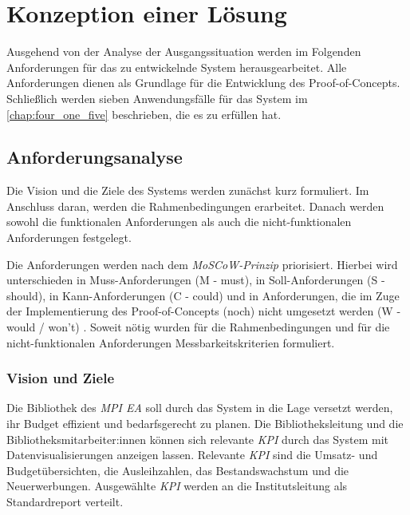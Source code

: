 \chapter{Konzeption einer Lösung}
\label{chap:four}
Ausgehend von der Analyse der Ausgangssituation werden im Folgenden 
Anforderungen für das zu entwickelnde System herausgearbeitet.
Alle Anforderungen dienen als Grundlage für die Entwicklung des Proof-of-Concepts. 
Schließlich werden sieben Anwendungsfälle für das System im \autoref{chap:four_one_five} beschrieben, die es zu erfüllen hat.


\section{Anforderungsanalyse}
Die Vision und die Ziele des Systems werden zunächst kurz formuliert. Im Anschluss daran, werden die Rahmenbedingungen erarbeitet. Danach werden sowohl die funktionalen Anforderungen als
auch die nicht-funktionalen Anforderungen festgelegt. 


Die Anforderungen werden nach dem \textit{MoSCoW-Prinzip} priorisiert. 
Hierbei wird unterschieden in Muss-Anforderungen (M - must), in Soll-Anforderungen (S - should), in Kann-Anforderungen (C - could) und in Anforderungen,
die im Zuge der Implementierung des Proof-of-Concepts (noch) nicht umgesetzt werden (W - would / won't) \cite[vgl.][57]{stephens_beginning_2015}.
Soweit nötig wurden für die Rahmenbedingungen und für die nicht-funktionalen Anforderungen Messbarkeitskriterien formuliert. 

\subsection{Vision und Ziele}
Die Bibliothek des \textit{\acrshort{MPI EA}} soll durch das System in die Lage versetzt werden, ihr Budget effizient und bedarfsgerecht zu planen.
Die Bibliotheksleitung und die Bibliotheksmitarbeiter:innen können sich relevante \textit{\acrlong{KPI}} durch das System mit
Datenvisualisierungen anzeigen lassen. Relevante \textit{\acrshort{KPI}} sind die Umsatz- und Budgetübersichten, die Ausleihzahlen, das Bestandswachstum und die
Neuerwerbungen. 
Ausgewählte \textit{\acrshort{KPI}} werden an die Institutsleitung als Standardreport verteilt.

